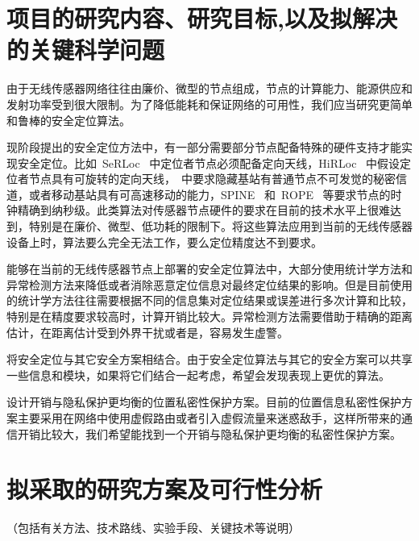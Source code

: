 \documentclass[a4paper,10pt]{article}
\begin{document}
\section{项目的研究内容、研究目标,以及拟解决的关键科学问题} 

由于无线传感器网络往往由廉价、微型的节点组成，节点的计算能力、能源供应和发射功率受到很大限制。为了降低能耗和保证网络的可用性，我们应当研究更简单和鲁棒的安全定位算法。

现阶段提出的安全定位方法中，有一部分需要部分节点配备特殊的硬件支持才能实现安全定位。比如~SeRLoc \cite{Lazos2005}~中定位者节点必须配备定向天线，HiRLoc \cite{Lazos2005a}~中假设定位者节点具有可旋转的定向天线，\cite{Capkun2006a, Capkun2008}~中要求隐藏基站有普通节点不可发觉的秘密信道，或者移动基站具有可高速移动的能力，SPINE \cite{Capkun2006}~和~ROPE \cite{Lazos2006}~等要求节点的时钟精确到纳秒级。此类算法对传感器节点硬件的要求在目前的技术水平上很难达到，特别是在廉价、微型、低功耗的限制下。将这些算法应用到当前的无线传感器设备上时，算法要么完全无法工作，要么定位精度达不到要求。

能够在当前的无线传感器节点上部署的安全定位算法中，大部分使用统计学方法和异常检测方法来降低或者消除恶意定位信息对最终定位结果的影响。但是目前使用的统计学方法往往需要根据不同的信息集对定位结果或误差进行多次计算和比较，特别是在精度要求较高时，计算开销比较大。异常检测方法需要借助于精确的距离估计，在距离估计受到外界干扰或者是，容易发生虚警。

将安全定位与其它安全方案相结合。由于安全定位算法与其它的安全方案可以共享一些信息和模块，如果将它们结合一起考虑，希望会发现表现上更优的算法。

设计开销与隐私保护更均衡的位置私密性保护方案。目前的位置信息私密性保护方案主要采用在网络中使用虚假路由或者引入虚假流量来迷惑敌手，这样所带来的通信开销比较大，我们希望能找到一个开销与隐私保护更均衡的私密性保护方案。

\section{拟采取的研究方案及可行性分析} 

（包括有关方法、技术路线、实验手段、关键技术等说明）
\end{document}
